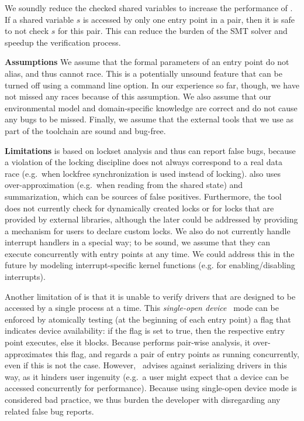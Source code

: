 We soundly reduce the checked shared variables to increase the performance of \whoop. If a shared variable $s$ is accessed by only one entry point in a pair, then it is safe to not check $s$ for this pair. This can reduce the burden of the SMT solver and speedup the verification process.

\medskip\noindent\textbf{Assumptions }
%
We assume that the formal parameters of an entry point do not alias, and thus cannot race. This is a potentially unsound feature that can be turned off using a command line option. In our experience so far, though, we have not missed any races because of this assumption. We also assume that our environmental model and domain-specific knowledge are correct and do not cause any bugs to be missed. Finally, we assume that the external tools that we use as part of the \whoop toolchain are sound and bug-free.

\medskip\noindent\textbf{Limitations }
%
\whoop is based on lockset analysis and thus can report false bugs, because a violation of the locking discipline does not always correspond to a real data race (e.g.\ when lockfree synchronization is used instead of locking). \whoop also uses over-approximation (e.g.\ when reading from the shared state) and summarization, which can be sources of false positives. Furthermore, the tool does not currently check for dynamically created locks or for locks that are provided by external libraries, although the later could be addressed by providing a mechanism for users to declare custom locks. We also do not currently handle interrupt handlers in a special way; to be sound, we assume that they can execute concurrently with entry points at any time. We could address this in the future by modeling interrupt-specific kernel functions (e.g. for enabling/disabling interrupts).

Another limitation of \whoop is that it is unable to verify drivers that are designed to be accessed by a single process at a time. This \emph{single-open device}~\cite{corbet2005linux} mode can be enforced by atomically testing (at the beginning of each entry point) a flag that indicates device availability: if the flag is set to true, then the respective entry point executes, else it blocks. Because \whoop performs pair-wise analysis, it over-approximates this flag, and regards a pair of entry points as running concurrently, even if this is not the case. However,~\cite{corbet2005linux} advises against serializing drivers in this way, as it hinders user ingenuity (e.g.\ a user might expect that a device can be accessed concurrently for performance). Because using single-open device mode is considered bad practice, we thus burden the developer with disregarding any related false bug reports.

